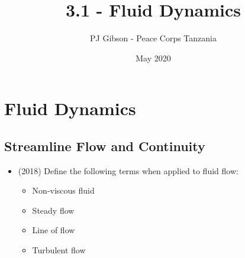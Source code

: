 \documentclass{article}
\title{3.1 - Fluid Dynamics}
\author{PJ Gibson - Peace Corps Tanzania}
\date{May 2020}
\begin{document}
\maketitle


\section{Fluid Dynamics}

\subsection{Streamline Flow and Continuity}
\begin{itemize}
\item (2018)  Define the following terms when applied to fluid flow:
 \begin{itemize}
\item Non-viscous fluid 
\item Steady flow 
\item Line of flow 
\item Turbulent flow
\end{itemize}
\end{itemize}
\end{document}
